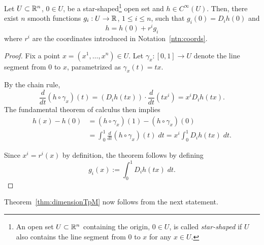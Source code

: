 \begin{lemma}\label{lem:Taylor}
	Let $U\subset\mathbb{R}^n$, $0\in U$, be a star-shaped\footnote{An open set $U\subset\mathbb{R}^n$ containing the origin, $0\in U$, is called \emph{star-shaped} if $U$ also contains the line segment from $0$ to $x$ for any $x\in U$.} open set and $h\in C^\infty(U)$.
	Then, there exist $n$ smooth functions $g_i: U \to \mathbb{R}$, $1\leq i \leq n$, such that $g_i(0) = D_i h(0)$ and
	\begin{equation}
		h = h(0) + r^i g_i
	\end{equation}
	where $r^i$ are the coordinates introduced in Notation~\ref{ntn:coords}.
\end{lemma}
\begin{proof}
	Fix a point $x = (x^1, \ldots, x^n) \in U$.
	Let $\gamma_x:[0,1]\to U$ denote the line segment from $0$ to $x$, parametrized as $\gamma_x(t) = tx$.

	By the chain rule,
	\begin{equation}
		\frac{d}{dt}(h \circ \gamma_x) (t) = \left(D_i h(t x)\right) \cdot \frac{d}{dt} (t x^i) = x^i D_i h(t x).
	\end{equation}
	The fundamental theorem of calculus then implies
	\begin{align}
		h(x) - h(0) & = (h \circ \gamma_x)(1) - (h \circ \gamma_x)(0)                                 \\
		            & = \int_0^1 \frac{d}{dt}(h \circ \gamma_x)(t)\;dt = x^i \int_0^1 D_i h(tx)\; dt.
	\end{align}

	Since $x^i = r^i(x)$ by definition, the theorem follows by defining
	\begin{equation}
		g_i(x) := \int_0^1 D_i h(tx)\; dt.
	\end{equation}
\end{proof}

Theorem~\ref{thm:dimensionTpM} now follows from the next statement.

